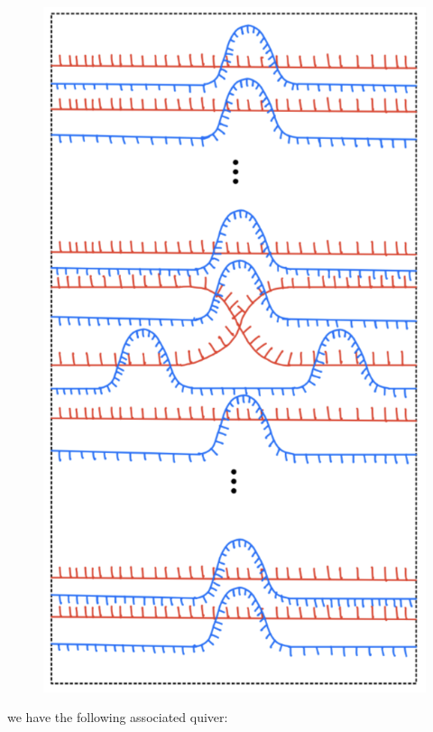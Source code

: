 \begin{figure}[H] 
    \centering
    \includegraphics[scale = 0.55]{diagrams/local_systems_on_as_diagrams/1.png} 
    \caption{}
    \label{fig:your-label}
\end{figure}

we have the following associated quiver:

